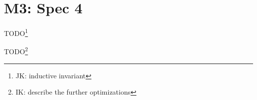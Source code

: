 
\section{M3: Spec 4}

TODO\footnote{JK: inductive invariant}

TODO\footnote{IK: describe the further optimizations}

